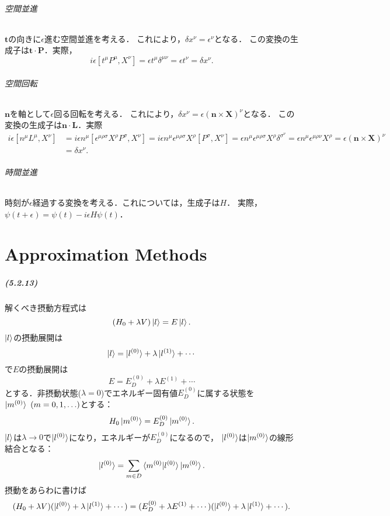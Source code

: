 \documentclass[a4paper]{ltjsreport}
\begin{document}
\subparagraph{空間並進}
$\boldsymbol{t}$の向きに$\epsilon$進む空間並進を考える．
これにより，$\delta x^\nu = \epsilon^\nu$となる．
この変換の生成子は$\boldsymbol{t} \cdot \boldsymbol{P}$．実際，
\[ i \epsilon [t^\mu P^\mu , X^\nu] = \epsilon t^\mu \delta^{\mu\nu} = \epsilon t^\nu = \delta x^\nu . \]

\subparagraph{空間回転}
$\boldsymbol{n}$を軸として$\epsilon$回る回転を考える．
これにより，$\delta x^\nu = \epsilon (\boldsymbol{n} \times \boldsymbol{X})^\nu$となる．
この変換の生成子は$\boldsymbol{n} \cdot \boldsymbol{L}$．実際
\begin{align*}
  i \epsilon [n^\mu L^\mu , X^\nu] &= i \epsilon n^\mu [\epsilon^{\mu\rho\sigma} X^\rho P^\sigma , X^\nu]
  = i \epsilon n^\mu \epsilon^{\mu\rho\sigma} X^\rho [P^\sigma , X^\nu]
  = \epsilon n^\mu \epsilon^{\mu\rho\sigma} X^\rho \delta^{\sigma^\nu}
  = \epsilon n^\mu \epsilon^{\mu\rho\nu} X^\rho
  = \epsilon (\boldsymbol{n} \times \boldsymbol{X})^\nu \\
  &= \delta x^\nu .
\end{align*}

\subparagraph{時間並進}
時刻が$\epsilon$経過する変換を考える．これについては，生成子は$H$．
実際，$\psi(t + \epsilon) = \psi(t) - i \epsilon H \psi(t)$．


\chapter{Approximation Methods}
\paragraph{(5.2.13)}
解くべき摂動方程式は
\[(H_0 + \lambda V) \ket{l} = E \ket{l}.\]
$\ket{l}$の摂動展開は
\[\ket{l} = \ket{l^{(0)}} + \lambda \ket{l^{(1)}} + \cdots\]
で$E$の摂動展開は
\[E = E_D^{(0)} + \lambda E^{(1)} + \cdots\]
とする．非摂動状態($\lambda = 0$)でエネルギー固有値$E_D^{(0)}$に属する状態を$\ket{m^{(0)}} ~ (m = 0, 1, \ldots)$とする：
\[H_0 \ket{m^{(0)}} = E_D^{(0)} \ket{m^{(0)}}.\]
$\ket{l}$は$\lambda \to 0$で$\ket{l^{(0)}}$になり，エネルギーが$E_D^{(0)}$になるので，
$\ket{l^{(0)}}$は$\ket{m^{(0)}}$の線形結合となる：
\[\ket{l^{(0)}} = \sum_{m \in D} \braket{m^{(0)} | l^{(0)}} \ket{m^{(0)}}.\]
摂動をあらわに書けば
\[(H_0 + \lambda V) (\ket{l^{(0)}} + \lambda \ket{l^{(1)}} + \cdots) = (E_D^{(0)} + \lambda E^{(1)} + \cdots) (\ket{l^{(0)}} + \lambda \ket{l^{(1)}} + \cdots).\]
\end{document}

